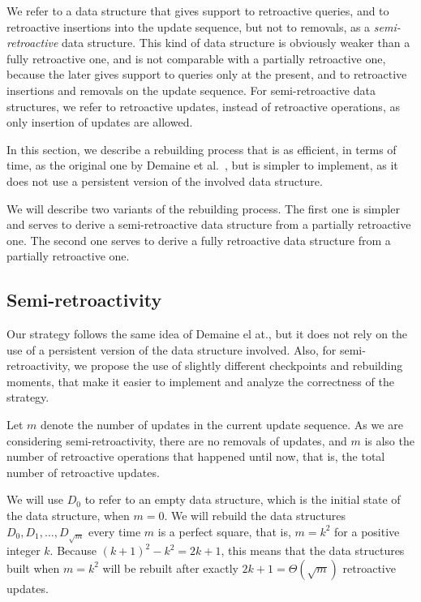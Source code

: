 \documentclass[reqno,11pt]{amsart}
\begin{document}
We refer to a data structure that gives support to retroactive queries, 
and to retroactive insertions into the update sequence, but not to removals, 
as a \emph{semi-retroactive} data structure.
This kind of data structure is obviously weaker than a fully retroactive one, and
is not comparable with a partially retroactive one, because the later gives support 
to queries only at the present, and to retroactive insertions and removals on the 
update sequence.  For semi-retroactive data structures, we refer to retroactive 
updates, instead of retroactive operations, as only insertion of updates are allowed. 

In this section, we describe a rebuilding process that is as efficient, in terms 
of time, as the original one by Demaine et al.~\cite{DemaineIL2007}, but is simpler 
to implement, as it does not use a persistent version of the involved data structure. 

We will describe two variants of the rebuilding process. The first one is simpler
and serves to derive a semi-retroactive data structure from a partially retroactive 
one.  The second one serves to derive a fully retroactive data structure from a 
partially retroactive one. 

\subsection{Semi-retroactivity}\label{subsec:semi}

Our strategy follows the same idea of Demaine el at., but it does not 
rely on the use of a persistent version of the data structure involved. 
Also, for semi-retroactivity, we propose the use of slightly different 
checkpoints and rebuilding moments, that make it easier to implement 
and analyze the correctness of the strategy. 

Let $m$ denote the number of updates in the current update sequence. 
As we are considering semi-retroactivity, there are no removals of updates, 
and $m$ is also the number of retroactive operations that happened until now, 
that is, the total number of retroactive updates. 

We will use $D_0$ to refer to an empty data structure, 
which is the initial state of the data structure, when $m=0$. 
We will rebuild the data structures $D_0,D_1,\ldots,D_{\sqrt{m}}$ every 
time $m$ is a perfect square, that is, $m=k^2$ for a positive integer $k$.
Because $(k+1)^2-k^2 = 2k+1$, this means that the data structures built 
when $m=k^2$ will be rebuilt after exactly $2k+1=\Theta(\sqrt{m})$ retroactive updates.
\end{document}
